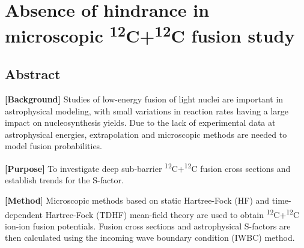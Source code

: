 
\chapter{Absence of hindrance in microscopic \textsuperscript{12}C+\textsuperscript{12}C fusion study}\label{chapters:chapter_6}
\vspace{-7mm}

\author[1]{K. Godbey}



\author[2]{C. Simenel}

\author[1]{A. S. Umar}

\date{\today}

\section*{Abstract}
	\edef\oldrightskip{\the\rightskip}

		\rightskip\oldrightskip\relax
		\setlength{\parskip}{0pt}
		
		{\bf [Background]} Studies of low-energy fusion of light nuclei are important in astrophysical modeling, with small variations in reaction rates having a large impact on nucleosynthesis yields. Due to the lack of experimental data at astrophysical energies, extrapolation and microscopic methods are needed to model fusion probabilities.
		
		{\bf [Purpose]} To investigate deep sub-barrier \textsuperscript{12}C+\textsuperscript{12}C fusion cross sections and establish trends for the S-factor.
		
		{\bf [Method}] Microscopic methods based on static Hartree-Fock (HF) and time-dependent Hartree-Fock (TDHF) mean-field theory are used to obtain \textsuperscript{12}C+\textsuperscript{12}C ion-ion fusion potentials. Fusion cross sections and astrophysical S-factors are then calculated using the incoming wave boundary condition (IWBC) method.
		

